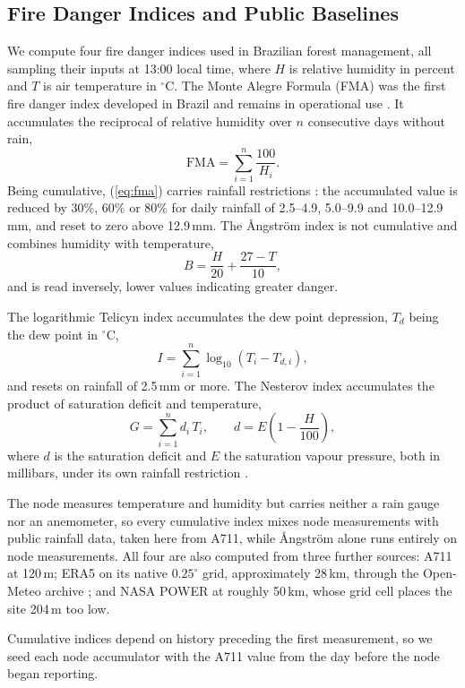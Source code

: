 \documentclass[conference]{IEEEtran}
\newenvironment{changed}{}{}
\begin{document}
\subsection{Fire Danger Indices and Public Baselines}
\begin{changed}
We compute four fire danger indices used in Brazilian forest management, all sampling their inputs at 13:00 local time, where $H$ is relative humidity in percent and $T$ is air temperature in $^\circ$C. The Monte Alegre Formula (FMA) was the first fire danger index developed in Brazil \cite{soares_1972} and remains in operational use \cite{torres_2008}. It accumulates the reciprocal of relative humidity over $n$ consecutive days without rain,
\begin{equation}
\mathrm{FMA} = \sum_{i=1}^{n} \frac{100}{H_i} .
\label{eq:fma}
\end{equation}
Being cumulative, (\ref{eq:fma}) carries rainfall restrictions \cite{torres_2008}: the accumulated value is reduced by 30\%, 60\% or 80\% for daily rainfall of 2.5--4.9, 5.0--9.9 and 10.0--12.9\,mm, and reset to zero above 12.9\,mm. The Ångström index \cite{angstrom_1942} is not cumulative and combines humidity with temperature,
\begin{equation}
B = \frac{H}{20} + \frac{27 - T}{10} ,
\label{eq:angstrom}
\end{equation}
and is read inversely, lower values indicating greater danger.

The logarithmic Telicyn index \cite{torres_2008} accumulates the dew point depression, $T_d$ being the dew point in $^\circ$C,
\begin{equation}
I = \sum_{i=1}^{n} \log_{10}\left(T_i - T_{d,i}\right) ,
\label{eq:telicyn}
\end{equation}
and resets on rainfall of 2.5\,mm or more. The Nesterov index \cite{nesterov_1949} accumulates the product of saturation deficit and temperature,
\begin{equation}
G = \sum_{i=1}^{n} d_i \, T_i , \qquad d = E\left(1 - \frac{H}{100}\right) ,
\label{eq:nesterov}
\end{equation}
where $d$ is the saturation deficit and $E$ the saturation vapour pressure, both in millibars, under its own rainfall restriction \cite{torres_2008}.

The node measures temperature and humidity but carries neither a rain gauge nor an anemometer, so every cumulative index mixes node measurements with public rainfall data, taken here from A711, while Ångström alone runs entirely on node measurements. All four are also computed from three further sources: A711 at 120\,m; ERA5 on its native $0.25^\circ$ grid, approximately 28\,km, through the Open-Meteo archive \cite{openmeteo_2023}; and NASA POWER at roughly 50\,km, whose grid cell places the site 204\,m too low.

Cumulative indices depend on history preceding the first measurement, so we seed each node accumulator with the A711 value from the day before the node began reporting.
\end{changed}
\end{document}
